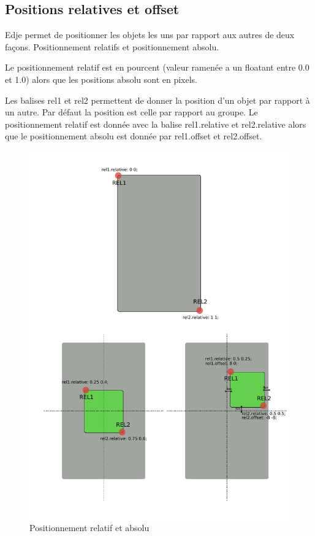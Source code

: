\documentclass[a4paper]{efr}
\begin{document}
\subsection{Positions relatives et offset}

Edje permet de positionner les objets les uns par rapport aux autres de deux
façons. Positionnement relatifs et positionnement absolu.

Le positionnement relatif est en pourcent (valeur ramenée a un floatant entre
0.0 et 1.0) alors que les positions absolu sont en pixels.

Les balises rel1 et rel2 permettent de donner la position d'un objet par rapport
à un autre. Par défaut la position est celle par rapport au groupe.
Le positionnement relatif est donnée avec la balise rel1.relative et
rel2.relative alors que le positionnement absolu est donnée par rel1.offset et 
rel2.offset.

\begin{figure}
  \begin{center}
    \includegraphics[scale=0.7]{images/rel1rel2.pdf}
  \end{center}
  \caption{Positionnement relatif et absolu}
\end{figure}
\end{document}
